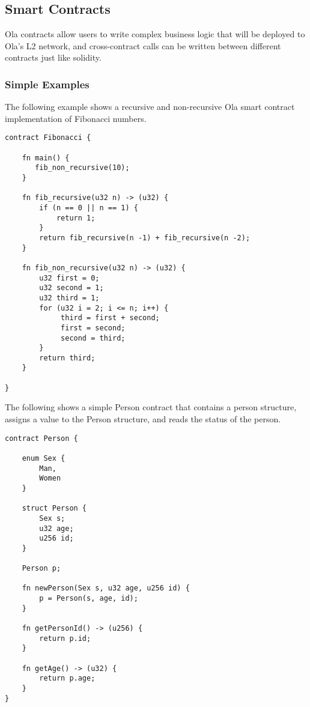\subsection{Smart Contracts}


Ola contracts allow users to write complex business logic that will be deployed to Ola's L2 network, and cross-contract calls can be written between different contracts just like solidity.

\subsubsection{Simple Examples}

The following example shows a recursive and non-recursive Ola smart contract implementation of Fibonacci numbers.

\begin{lstlisting}
contract Fibonacci {

    fn main() {
       fib_non_recursive(10);
    }

    fn fib_recursive(u32 n) -> (u32) {
        if (n == 0 || n == 1) {
            return 1;
        }
        return fib_recursive(n -1) + fib_recursive(n -2);
    }

    fn fib_non_recursive(u32 n) -> (u32) {
        u32 first = 0;
        u32 second = 1;
        u32 third = 1;
        for (u32 i = 2; i <= n; i++) {
             third = first + second;
             first = second;
             second = third;
        }
        return third;
    }

}
\end{lstlisting}

The following shows a simple Person contract that contains a person structure, assigns a value to the Person structure, and reads the status of the person.

\begin{lstlisting}
contract Person {

    enum Sex {
        Man,
        Women
    }

    struct Person {
        Sex s;
        u32 age;
        u256 id;
    }

    Person p;

    fn newPerson(Sex s, u32 age, u256 id) {
        p = Person(s, age, id);
    }

    fn getPersonId() -> (u256) {
        return p.id;
    }

    fn getAge() -> (u32) {
        return p.age;
    }
}
\end{lstlisting}


